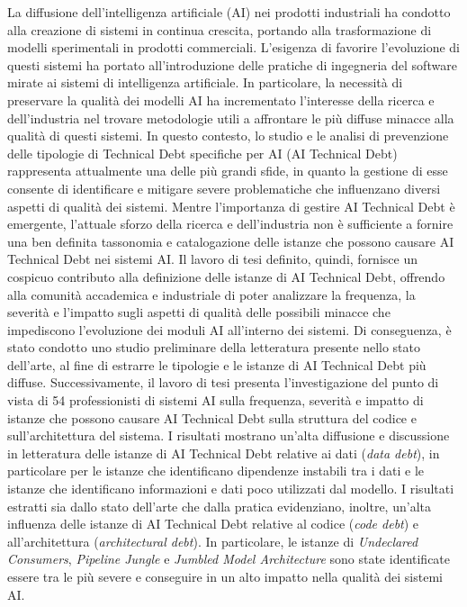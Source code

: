 La diffusione dell'intelligenza artificiale (AI) nei prodotti industriali ha condotto alla creazione di sistemi in continua crescita, portando alla trasformazione di modelli sperimentali in prodotti commerciali.
L'esigenza di favorire l'evoluzione di questi sistemi ha portato all'introduzione delle pratiche di ingegneria del software mirate ai sistemi di intelligenza artificiale.
In particolare, la necessità di preservare la qualità dei modelli AI ha incrementato l'interesse della ricerca e dell'industria nel trovare metodologie utili a affrontare le più diffuse minacce alla qualità di questi sistemi.
In questo contesto, lo studio e le analisi di prevenzione delle tipologie di Technical Debt specifiche per AI (AI Technical Debt) rappresenta attualmente una delle più grandi sfide, in quanto la gestione di esse consente di identificare e mitigare severe problematiche che influenzano diversi aspetti di qualità dei sistemi.
Mentre l'importanza di gestire AI Technical Debt è emergente, l'attuale sforzo della ricerca e dell'industria non è sufficiente a fornire una ben definita tassonomia e catalogazione delle istanze che possono causare AI Technical Debt nei sistemi AI.
Il lavoro di tesi definito, quindi, fornisce un cospicuo contributo alla definizione delle istanze di AI Technical Debt, offrendo alla comunità accademica e industriale di poter analizzare la frequenza, la severità e l'impatto sugli aspetti di qualità delle possibili minacce che impediscono l'evoluzione dei moduli AI all'interno dei sistemi.
Di conseguenza, è stato condotto uno studio preliminare della letteratura presente nello stato dell'arte, al fine di estrarre le tipologie e le istanze di AI Technical Debt più diffuse.
Successivamente, il lavoro di tesi presenta l'investigazione del punto di vista di 54 professionisti di sistemi AI sulla frequenza, severità e impatto di istanze che possono causare AI Technical Debt sulla struttura del codice e sull'architettura del sistema.
I risultati mostrano un'alta diffusione e discussione in letteratura delle istanze di AI Technical Debt relative ai dati (\textit{data debt}), in particolare per le istanze che identificano dipendenze instabili tra i dati e le istanze che identificano informazioni e dati poco utilizzati dal modello.
I risultati estratti sia dallo stato dell'arte che dalla pratica evidenziano, inoltre, un'alta influenza delle istanze di AI Technical Debt relative al codice (\textit{code debt}) e all'architettura (\textit{architectural debt}).
In particolare, le istanze di \textit{Undeclared Consumers}, \textit{Pipeline Jungle} e \textit{Jumbled Model Architecture} sono state identificate essere tra le più severe e conseguire in un alto impatto nella qualità dei sistemi AI.
